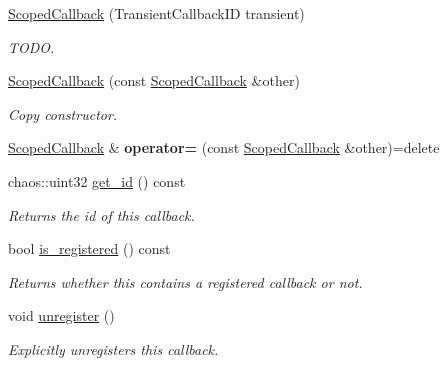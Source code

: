 \begin{DoxyCompactItemize}
\item 
\hypertarget{classsigma_1_1core_1_1_scoped_callback_aa6b342b546577026badad33e7bf521b9}{}\hyperlink{classsigma_1_1core_1_1_scoped_callback_aa6b342b546577026badad33e7bf521b9}{Scoped\+Callback} (Transient\+Callback\+I\+D transient)\label{classsigma_1_1core_1_1_scoped_callback_aa6b342b546577026badad33e7bf521b9}

\begin{DoxyCompactList}\small\item\em T\+O\+D\+O. \end{DoxyCompactList}\item 
\hyperlink{classsigma_1_1core_1_1_scoped_callback_ae39d91862f76b1804acc8edae410678e}{Scoped\+Callback} (const \hyperlink{classsigma_1_1core_1_1_scoped_callback}{Scoped\+Callback} \&other)
\begin{DoxyCompactList}\small\item\em Copy constructor. \end{DoxyCompactList}\item 
\hypertarget{classsigma_1_1core_1_1_scoped_callback_ab0eabc2e0c158643758501f9c6bc444c}{}\hyperlink{classsigma_1_1core_1_1_scoped_callback}{Scoped\+Callback} \& {\bfseries operator=} (const \hyperlink{classsigma_1_1core_1_1_scoped_callback}{Scoped\+Callback} \&other)=delete\label{classsigma_1_1core_1_1_scoped_callback_ab0eabc2e0c158643758501f9c6bc444c}

\item 
\hypertarget{classsigma_1_1core_1_1_scoped_callback_a3b4ae371184bb639999677cf66440461}{}chaos\+::uint32 \hyperlink{classsigma_1_1core_1_1_scoped_callback_a3b4ae371184bb639999677cf66440461}{get\+\_\+id} () const \label{classsigma_1_1core_1_1_scoped_callback_a3b4ae371184bb639999677cf66440461}

\begin{DoxyCompactList}\small\item\em Returns the id of this callback. \end{DoxyCompactList}\item 
bool \hyperlink{classsigma_1_1core_1_1_scoped_callback_adafe2e52e653bca84d11f1d0baaec616}{is\+\_\+registered} () const 
\begin{DoxyCompactList}\small\item\em Returns whether this contains a registered callback or not. \end{DoxyCompactList}\item 
void \hyperlink{classsigma_1_1core_1_1_scoped_callback_ad8d8ea4671f58077c8f9ef020e52e125}{unregister} ()
\begin{DoxyCompactList}\small\item\em Explicitly unregisters this callback. \end{DoxyCompactList}\end{DoxyCompactItemize}


